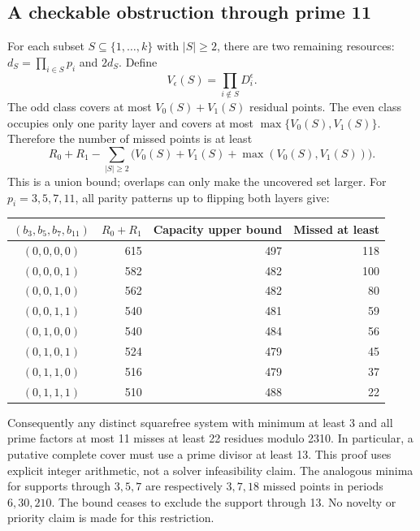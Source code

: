 \documentclass[11pt]{article}
\begin{document}
\subsection{A checkable obstruction through prime 11}
For each subset $S\subseteq\{1,\ldots,k\}$ with $|S|\ge2$, there are two
remaining resources: $d_S=\prod_{i\in S}p_i$ and $2d_S$. Define
\[
 V_\epsilon(S)=\prod_{i\notin S}D_i^\epsilon.
\]
The odd class covers at most $V_0(S)+V_1(S)$ residual points. The even
class occupies only one parity layer and covers at most
$\max\{V_0(S),V_1(S)\}$. Therefore the number of missed points is at least
\begin{equation}\label{eq:anchor-capacity}
 R_0+R_1-\sum_{|S|\ge2}\bigl(V_0(S)+V_1(S)+\max(V_0(S),V_1(S))\bigr).
\end{equation}
This is a union bound; overlaps can only make the uncovered set larger.
For $p_i=3,5,7,11$, all parity patterns up to flipping both layers give:
\begin{center}
\begin{tabular}{crrr}
\toprule
$(b_3,b_5,b_7,b_{11})$ & $R_0+R_1$ & Capacity upper bound & Missed at least\\
\midrule
$(0,0,0,0)$&615&497&118\\
$(0,0,0,1)$&582&482&100\\
$(0,0,1,0)$&562&482&80\\
$(0,0,1,1)$&540&481&59\\
$(0,1,0,0)$&540&484&56\\
$(0,1,0,1)$&524&479&45\\
$(0,1,1,0)$&516&479&37\\
$(0,1,1,1)$&510&488&22\\
\bottomrule
\end{tabular}
\end{center}
Consequently any distinct squarefree system with minimum at least 3 and
all prime factors at most 11 misses at least 22 residues modulo 2310.
In particular, a putative complete cover must use a prime divisor at least
13. This proof uses explicit integer arithmetic, not a solver infeasibility
claim. The analogous minima for supports through $3,5,7$ are respectively
$3,7,18$ missed points in periods $6,30,210$. The bound ceases to exclude
the support through 13. No novelty or priority claim is made for this restriction.
\end{document}
